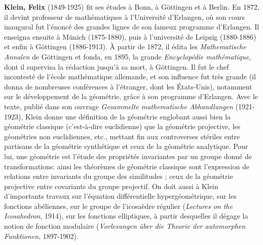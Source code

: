 \textbf{Klein, Felix} (1849-1925)  fit ses études à Bonn, à Göttingen et à Berlin. En 1872, il devint professeur de mathématiques à l'Université d'Erlangen, où son cours inaugural fut l'énoncé des grandes lignes de son fameux programme d'Erlangen. Il enseigna ensuite à Münich (1875-1880), puis à l'université de Leipzig (1880-1886) et enfin à Göttingen (1886-1913). À partir de 1872, il édita les \textit{Mathematische Annalen} de Göttingen et fonda, en 1895, la grande \textit{Encyclopédie mathématique}, dont il supervisa la rédaction jusqu'à sa mort, à Göttingen. Il fut le chef incontesté de l'école mathématique allemande, et son influence fut très grande (il donna de nombreuses conférences à l'étranger, dont les États-Unis), notamment sur le développement de la géométrie, grâce à son programme d'Erlangen. Avec le texte, publié dans son ouvrage \textit{Gesammelte mathematische Abhandlungen} (1921-1923), Klein donne une définition de la géométrie englobant aussi bien la géométrie classique (c'est-à-dire euclidienne) que la géométrie projective, les géométries non euclidiennes, etc., mettant fin aux controverses stériles entre partisans de la géométrie synthétique et ceux de la géométrie analytique. Pour lui, une géométrie est l'étude des propriétés invariantes par un groupe donné de transformations: ainsi les théorèmes de géométrie classique sont l'expression de relations entre invariants du groupe des similitudes ; ceux de la géométrie projective entre covariants du groupe projectif. On doit aussi à Klein d'importants travaux sur l'équation différentielle hypergéométrique, sur les fonctions abéliennes, sur le groupe de l'icosaèdre régulier (\textit{Lectures on the Icosahedron}, 1914), sur les fonctions elliptiques, à partir desquelles il dégage la notion de fonction modulaire (\textit{Vorlesungen über die Theorie der automorphen Funktionen}, 1897-1902).

